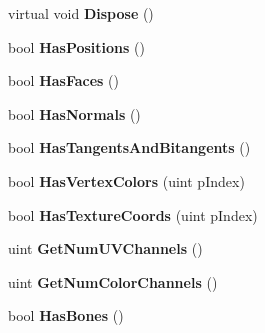 \begin{DoxyCompactItemize}
\item 
\hypertarget{structai_mesh_ad32f94dca6ca52739135acdfbd56b6b2}{virtual void {\bfseries Dispose} ()}\label{structai_mesh_ad32f94dca6ca52739135acdfbd56b6b2}

\item 
\hypertarget{structai_mesh_a3374455680d81b37dd23d0a122bd1384}{bool {\bfseries Has\+Positions} ()}\label{structai_mesh_a3374455680d81b37dd23d0a122bd1384}

\item 
\hypertarget{structai_mesh_a6376416e984b662175f97ae519628d7f}{bool {\bfseries Has\+Faces} ()}\label{structai_mesh_a6376416e984b662175f97ae519628d7f}

\item 
\hypertarget{structai_mesh_a513a8e3e344424bbcc73200526863a11}{bool {\bfseries Has\+Normals} ()}\label{structai_mesh_a513a8e3e344424bbcc73200526863a11}

\item 
\hypertarget{structai_mesh_a86699cc50cadc17785a66f8cd9e501e1}{bool {\bfseries Has\+Tangents\+And\+Bitangents} ()}\label{structai_mesh_a86699cc50cadc17785a66f8cd9e501e1}

\item 
\hypertarget{structai_mesh_af53d28d233e5dc33ee83e3d5d8a949e2}{bool {\bfseries Has\+Vertex\+Colors} (uint p\+Index)}\label{structai_mesh_af53d28d233e5dc33ee83e3d5d8a949e2}

\item 
\hypertarget{structai_mesh_aa78cc1fc785074ce3d8c816f6c98f6e0}{bool {\bfseries Has\+Texture\+Coords} (uint p\+Index)}\label{structai_mesh_aa78cc1fc785074ce3d8c816f6c98f6e0}

\item 
\hypertarget{structai_mesh_ad0b0437c498325dd4502494b113555a5}{uint {\bfseries Get\+Num\+U\+V\+Channels} ()}\label{structai_mesh_ad0b0437c498325dd4502494b113555a5}

\item 
\hypertarget{structai_mesh_a6f7ba0a49a12ec93d3da4fdd8e516ca6}{uint {\bfseries Get\+Num\+Color\+Channels} ()}\label{structai_mesh_a6f7ba0a49a12ec93d3da4fdd8e516ca6}

\item 
\hypertarget{structai_mesh_a8f72017be9b38e7e762c3b13b2308a74}{bool {\bfseries Has\+Bones} ()}\label{structai_mesh_a8f72017be9b38e7e762c3b13b2308a74}

\end{DoxyCompactItemize}
